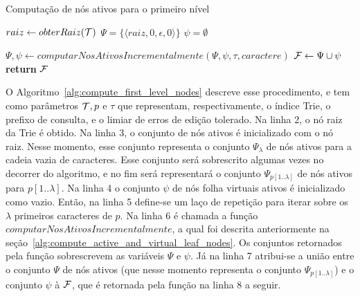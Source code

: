\begin{algorithm}[H]
\caption{Computação de nós ativos para o primeiro nível}\label{alg:compute_first_level_nodes}
\begin{algorithmic}[1]
    \State $raiz \leftarrow obterRaiz(\mathcal{T})$
    \State $\Psi = \{ \langle raiz, 0, \epsilon, 0 \rangle \}$
    \State $\psi = \emptyset$
    
        \State $\Psi, \psi \leftarrow computarNosAtivosIncrementalmente(\Psi, \psi, \tau, caractere)$
    \EndFor
    \State $\mathcal{F} \leftarrow \Psi \cup \psi$
    \State \textbf{return} $\mathcal{F}$
\EndFunction
\end{algorithmic}
\end{algorithm}

O Algoritmo~\ref{alg:compute_first_level_nodes} descreve esse procedimento, e tem como parâmetros $\mathcal{T}, p$ e $\tau$ que representam, respectivamente, o índice Trie, o prefixo de consulta, e o limiar de erros de edição tolerado. Na linha 2, o nó raiz da Trie é obtido. Na linha 3, o conjunto de nós ativos é inicializado com o nó raiz. Nesse momento, esse conjunto representa o conjunto $\Psi_{\lambda}$ de nós ativos para a cadeia vazia de caracteres. Esse conjunto será sobrescrito algumas vezes no decorrer do algoritmo, e no fim será representará o conjunto $\Psi_{p[1..\lambda]}$ de nós ativos para $p[1..\lambda]$. Na linha 4 o conjunto $\psi$ de nós folha virtuais ativos é inicializado como vazio. Então, na linha 5 define-se um laço de repetição para iterar sobre os $\lambda$ primeiros caracteres de $p$. Na linha 6 é chamada a função $computarNosAtivosIncrementalmente$, a qual foi descrita anteriormente na seção~\ref{alg:compute_active_and_virtual_leaf_nodes}. Os conjuntos retornados pela função sobrescrevem as variáveis $\Psi$ e $\psi$. Já na linha 7 atribui-se a união entre o conjunto $\Psi$ de nós ativos (que nesse momento representa o conjunto $\Psi_{p[1..\lambda]}$) e o conjunto $\psi$ à $\mathcal{F}$, que é retornada pela função na linha 8 a seguir.


